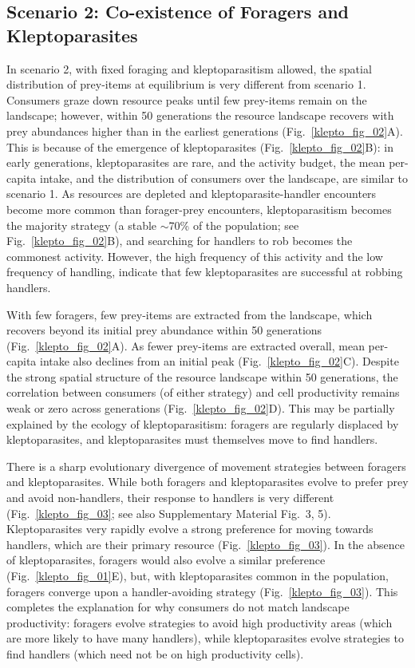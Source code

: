 \subsection*{Scenario 2: Co-existence of Foragers and Kleptoparasites}

In scenario 2, with fixed foraging and kleptoparasitism allowed, the spatial distribution of prey-items at equilibrium is very different from scenario 1.
Consumers graze down resource peaks until few prey-items remain on the landscape; however, within 50 generations the resource landscape recovers with prey abundances higher than in the earliest generations (Fig.~\ref{klepto_fig_02}A).
This is because of the emergence of kleptoparasites (Fig.~\ref{klepto_fig_02}B): in early generations, kleptoparasites are rare, and the activity budget, the mean per-capita intake, and the distribution of consumers over the landscape, are similar to scenario 1.
As resources are depleted and kleptoparasite-handler encounters become more common than forager-prey encounters, kleptoparasitism becomes the majority strategy (a stable $\sim$70\% of the population; see Fig.~\ref{klepto_fig_02}B), and searching for handlers to rob becomes the commonest activity.
However, the high frequency of this activity and the low frequency of handling, indicate that few kleptoparasites are successful at robbing handlers.

With few foragers, few prey-items are extracted from the landscape, which recovers beyond its initial prey abundance within 50 generations (Fig.~\ref{klepto_fig_02}A).
As fewer prey-items are extracted overall, mean per-capita intake also declines from an initial peak (Fig.~\ref{klepto_fig_02}C).
Despite the strong spatial structure of the resource landscape within 50 generations, the correlation between consumers (of either strategy) and cell productivity remains weak or zero across generations (Fig.~\ref{klepto_fig_02}D).
This may be partially explained by the ecology of kleptoparasitism: foragers are regularly displaced by kleptoparasites, and kleptoparasites must themselves move to find handlers.

There is a sharp evolutionary divergence of movement strategies between foragers and kleptoparasites.
While both foragers and kleptoparasites evolve to prefer prey and avoid non-handlers, their response to handlers is very different (Fig.~\ref{klepto_fig_03}; see also Supplementary Material Fig.~3, 5).
Kleptoparasites very rapidly evolve a strong preference for moving towards handlers, which are their primary resource (Fig.~\ref{klepto_fig_03}).
In the absence of kleptoparasites, foragers would also evolve a similar preference (Fig.~\ref{klepto_fig_01}E), but, with kleptoparasites common in the population, foragers converge upon a handler-avoiding strategy (Fig.~\ref{klepto_fig_03}).
This completes the explanation for why consumers do not match landscape productivity: foragers evolve strategies to avoid high productivity areas (which are more likely to have many handlers), while kleptoparasites evolve strategies to find handlers (which need not be on high productivity cells).

